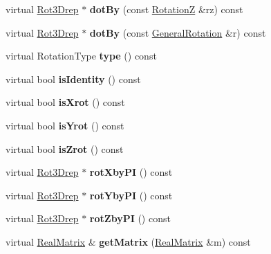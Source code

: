 \begin{DoxyCompactItemize}
\item 
\mbox{\label{classGeneralRotation_ac6e1bfb01f9b9765dd458c1817c8eb58}} 
virtual \hyperlink{classRot3Drep}{Rot3\+Drep} $\ast$ {\bfseries dot\+By} (const \hyperlink{classRotationZ}{RotationZ} \&rz) const
\item 
\mbox{\label{classGeneralRotation_a1dc153b8a8fa42528c8bdb336def6c2d}} 
virtual \hyperlink{classRot3Drep}{Rot3\+Drep} $\ast$ {\bfseries dot\+By} (const \hyperlink{classGeneralRotation}{General\+Rotation} \&r) const
\item 
\mbox{\label{classGeneralRotation_a3405154f0ffc8804034e13ed58c1d659}} 
virtual Rotation\+Type {\bfseries type} () const
\item 
\mbox{\label{classGeneralRotation_a2f8be1dfef1cf8d5a1e7ada7bae98e49}} 
virtual bool {\bfseries is\+Identity} () const
\item 
\mbox{\label{classGeneralRotation_aea3676c3cbebc5cf93a85a1065cadba0}} 
virtual bool {\bfseries is\+Xrot} () const
\item 
\mbox{\label{classGeneralRotation_a40409a8d5543a86a138b62dfc517f802}} 
virtual bool {\bfseries is\+Yrot} () const
\item 
\mbox{\label{classGeneralRotation_a14e95c78dab01a7cd84df4be04fc63f7}} 
virtual bool {\bfseries is\+Zrot} () const
\item 
\mbox{\label{classGeneralRotation_a433a4b23bd06d30b506d99d1684afbf7}} 
virtual \hyperlink{classRot3Drep}{Rot3\+Drep} $\ast$ {\bfseries rot\+Xby\+PI} () const
\item 
\mbox{\label{classGeneralRotation_a5d2b0137dfdf9d0c743443e9fefd3aa6}} 
virtual \hyperlink{classRot3Drep}{Rot3\+Drep} $\ast$ {\bfseries rot\+Yby\+PI} () const
\item 
\mbox{\label{classGeneralRotation_a976d4d8dc5e180e3dd941e9e4585f8a5}} 
virtual \hyperlink{classRot3Drep}{Rot3\+Drep} $\ast$ {\bfseries rot\+Zby\+PI} () const
\item 
\mbox{\label{classGeneralRotation_a759442801151e2716ec11b453b404026}} 
virtual \hyperlink{classTLAS_1_1Matrix}{Real\+Matrix} \& {\bfseries get\+Matrix} (\hyperlink{classTLAS_1_1Matrix}{Real\+Matrix} \&m) const
\end{DoxyCompactItemize}
